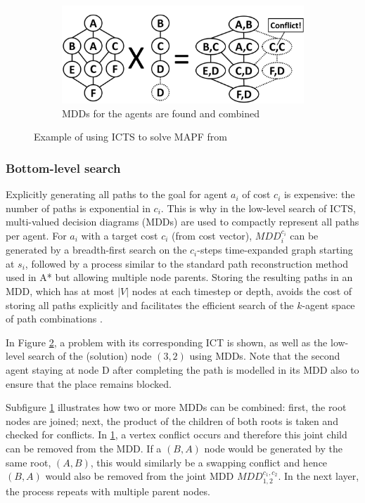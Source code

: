 \documentclass[english,10pt]{article}
\begin{document}
\begin{figure}[b]
		\begin{subfigure}{0.4\textwidth}
			\centering
			\includegraphics[width=\linewidth]{img/mdds}
			\caption{MDDs for the agents are found and combined}
			\label{fig:mdds}
		\end{subfigure}
		
		\caption{Example of using ICTS to solve MAPF from \cite{sharon2011}}
		\label{fig:bottom}
	\end{figure}
	\subsubsection{Bottom-level search}
	Explicitly generating all paths to the goal for agent $a_i$ of cost $c_i$ is expensive: the number of paths is exponential in $c_i$. This is why in the low-level search of ICTS, multi-valued decision diagrams (MDDs) are used to compactly represent all paths per agent. For $a_i$ with a target cost $c_i$ (from cost vector), $MDD_i^{c_i}$ can be generated by a breadth-first search on the $c_i$-steps time-expanded graph starting at $s_i$, followed by a process similar to the standard path reconstruction method used in A* but allowing multiple node parents. Storing the resulting paths in an MDD, which has at most $|V|$ nodes at each timestep or depth, avoids the cost of storing all paths explicitly and facilitates the efficient search of the $k$-agent space of path combinations \cite{sharon2011}.

	In Figure \ref{fig:bottom}, a problem with its corresponding ICT is shown, as well as the low-level search of the (solution) node $(3,2)$ using MDDs. Note that the second agent staying at node D after completing the path is modelled in its MDD also to ensure that the place remains blocked.
	
	Subfigure \ref{fig:mdds} illustrates how two or more MDDs can be combined: first, the root nodes are joined; next, the product of the children of both roots is taken and checked for conflicts. In \ref{fig:mdds}, a vertex conflict occurs and therefore this joint child can be removed from the MDD. If a $(B,A)$ node would be generated by the same root, $(A,B)$, this would similarly be a swapping conflict and hence $(B,A)$ would also be removed from the joint MDD $MDD_{1,2}^{c_1,c_2}$. In the next layer, the process repeats with multiple parent nodes.
	
\end{document}
